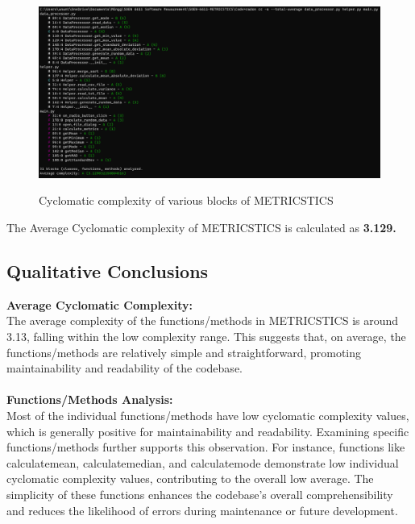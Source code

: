 \documentclass[runningheads]{llncs}
\begin{document}
\begin{figure}[htb]
\begin{center}
\includegraphics[width=14cm]{Cyclomatic_Complexity.png}
\caption \protect Cyclomatic complexity of various blocks of METRICSTICS
\end{center}
\end{figure}

\vspace{5pt} %

\noindent
The Average Cyclomatic complexity of METRICSTICS is calculated as \textbf{3.129.}

\subsection{Qualitative Conclusions}
\textbf{Average Cyclomatic Complexity:}\\
The average complexity of the functions/methods in METRICSTICS is around 3.13, falling within the low complexity range. This suggests that, on average, the functions/methods are relatively simple and straightforward, promoting maintainability and readability of the codebase.\\
\\
\textbf{Functions/Methods Analysis:}\\
Most of the individual functions/methods have low cyclomatic complexity values, which is generally positive for maintainability and readability. Examining specific functions/methods further supports this observation. For instance, functions like calculate\textunderscore mean, calculate\textunderscore median, and calculate\textunderscore mode demonstrate low individual cyclomatic complexity values, contributing to the overall low average. The simplicity of these functions enhances the codebase's overall comprehensibility and reduces the likelihood of errors during maintenance or future development.
\end{document}
